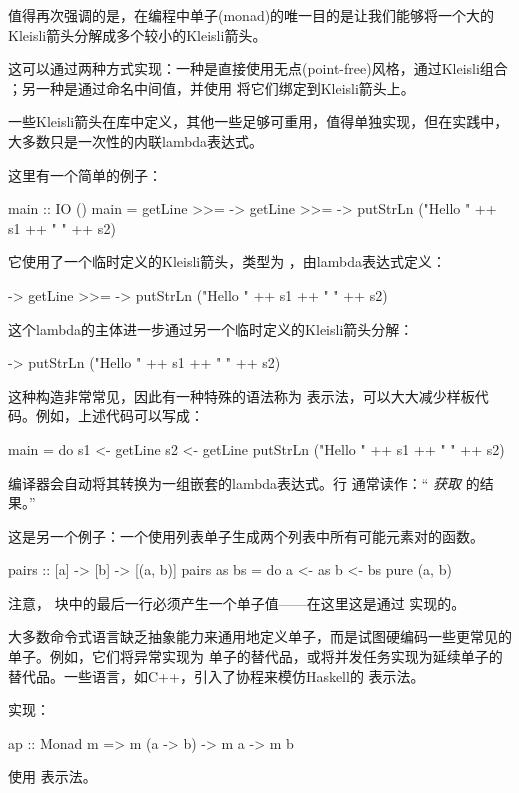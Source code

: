\documentclass[DaoFP]{subfiles}
\begin{document}
值得再次强调的是，在编程中单子(monad)的唯一目的是让我们能够将一个大的Kleisli箭头分解成多个较小的Kleisli箭头。

这可以通过两种方式实现：一种是直接使用无点(point-free)风格，通过Kleisli组合 \hask{<=<}；另一种是通过命名中间值，并使用 \hask{>>=} 将它们绑定到Kleisli箭头上。

一些Kleisli箭头在库中定义，其他一些足够可重用，值得单独实现，但在实践中，大多数只是一次性的内联lambda表达式。

这里有一个简单的例子：
\begin{haskell}
main :: IO ()
main = 
  getLine >>=  ->
    getLine >>=  ->
      putStrLn ("Hello " ++ s1 ++ " " ++ s2)
\end{haskell}
它使用了一个临时定义的Kleisli箭头，类型为 ，由lambda表达式定义：
\begin{haskell}
 ->
    getLine >>=  ->
      putStrLn ("Hello " ++ s1 ++ " " ++ s2)
\end{haskell}
这个lambda的主体进一步通过另一个临时定义的Kleisli箭头分解：
\begin{haskell}
 -> putStrLn ("Hello " ++ s1 ++ " " ++ s2)
\end{haskell}

这种构造非常常见，因此有一种特殊的语法称为  表示法，可以大大减少样板代码。例如，上述代码可以写成：
\begin{haskell}
main = do
  s1 <- getLine
  s2 <- getLine
  putStrLn ("Hello " ++ s1 ++ " " ++ s2)
\end{haskell}
编译器会自动将其转换为一组嵌套的lambda表达式。行  通常读作：`` \emph{获取}  的结果。''

这是另一个例子：一个使用列表单子生成两个列表中所有可能元素对的函数。
\begin{haskell}
pairs :: [a] -> [b] -> [(a, b)]
pairs as bs = do
  a <- as
  b <- bs
  pure (a, b)
\end{haskell}
注意， 块中的最后一行必须产生一个单子值——在这里这是通过  实现的。

大多数命令式语言缺乏抽象能力来通用地定义单子，而是试图硬编码一些更常见的单子。例如，它们将异常实现为  单子的替代品，或将并发任务实现为延续单子的替代品。一些语言，如C++，引入了协程来模仿Haskell的  表示法。

\begin{exercise}
实现：
\begin{haskell}
ap :: Monad m => m (a -> b) -> m a -> m b
\end{haskell}
使用  表示法。
\end{exercise}
\end{document}
